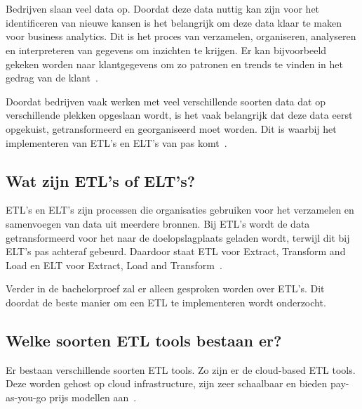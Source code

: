 \chapter{}%
\label{ch:stand-van-zaken}



Bedrijven slaan veel data op. Doordat deze data nuttig kan zijn voor het identificeren van nieuwe kansen is het belangrijk om deze data klaar te maken voor business analytics. Dit is het proces van verzamelen, organiseren, analyseren en interpreteren van gegevens om inzichten te krijgen. Er kan bijvoorbeeld gekeken worden naar klantgegevens om zo patronen en trends te vinden in het gedrag van de klant~\autocite{PratibhaKumari2023}.

Doordat bedrijven vaak werken met veel verschillende soorten data dat op verschillende plekken opgeslaan wordt, is het vaak belangrijk dat deze data eerst opgekuist, getransformeerd en georganiseerd moet worden. Dit is waarbij het implementeren van ETL's en ELT's van pas komt~\autocite{Inmon2023}.

\section{Wat zijn ETL's of ELT's?}

ETL's en ELT's zijn processen die organisaties gebruiken voor het verzamelen en samenvoegen van data uit meerdere bronnen. Bij ETL's wordt de data getransformeerd voor het naar de doelopslagplaats geladen wordt, terwijl dit bij ELT's pas achteraf gebeurd. Daardoor staat ETL voor Extract, Transform and Load en ELT voor Extract, Load and Transform~\autocite{Bartley2023}.

Verder in de bachelorproef zal er alleen gesproken worden over ETL's. Dit doordat de beste manier om een ETL te implementeren wordt onderzocht.

\section{Welke soorten ETL tools bestaan er?}

Er bestaan verschillende soorten ETL tools. Zo zijn er de cloud-based ETL tools. Deze worden gehost op cloud infrastructure, zijn zeer schaalbaar en bieden pay-as-you-go prijs modellen aan~\autocite{Ethan2024}.

